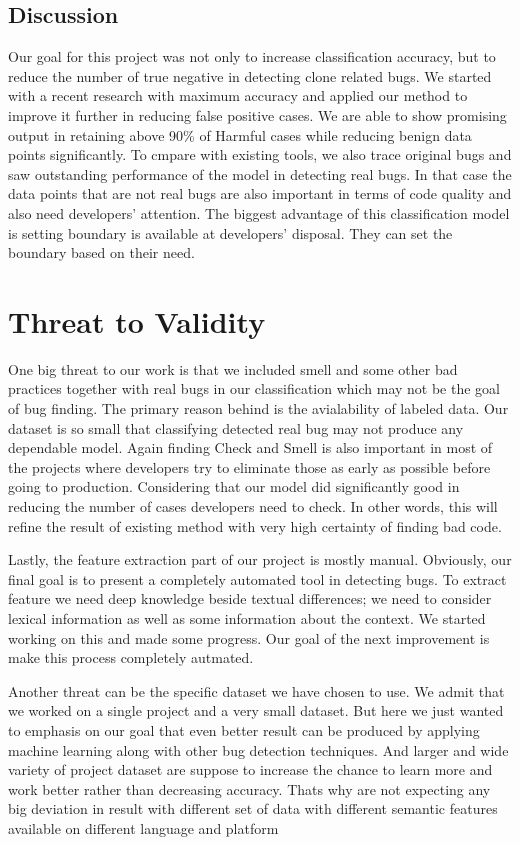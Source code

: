 \documentclass[nocopyrightspace]{sigplanconf}
\begin{document}
\subsection{Discussion}
Our goal for this project was not only to increase classification accuracy, but to reduce the number of true negative in detecting clone related bugs. We started with a recent research with maximum accuracy and applied our method to improve it further in reducing false positive cases. We are able to show promising output in retaining above 90\% of Harmful cases while reducing benign data points significantly. To cmpare with existing tools, we also trace original bugs and saw outstanding performance of the model in detecting real bugs. In that case the data points that are not real bugs are also important in terms of code quality and also need developers' attention. The biggest advantage of this classification model is setting boundary is available at developers' disposal. They can set the boundary based on their need.

\section{Threat to Validity}
One big threat to our work is that we included smell and some other bad practices together with real bugs in our classification which may not be the goal of bug finding. The primary reason behind is the avialability of labeled data. Our dataset is so small that classifying detected real bug may not produce any dependable model. Again finding Check and Smell is also important in most of the projects where developers try to eliminate those as early as possible before going to production. Considering that our model did significantly good in reducing the number of cases developers need to check. In other words, this will refine the result of existing method with very high certainty of finding bad code.

\vspace{10pt}
\noindent
Lastly, the feature extraction part of our project is mostly manual. Obviously, our final goal is to present a completely automated tool in detecting bugs. To extract feature we need deep knowledge beside textual differences; we need to consider lexical information as well as some information about the context. We started working on this and made some progress. Our goal of the next improvement is make this process completely autmated.

\vspace{10pt}
\noindent
Another threat can be the specific dataset we have chosen to use. We admit that we worked on a single project and a very small dataset. But here we just wanted to emphasis on our goal that even better result can be produced by applying machine learning along with other bug detection techniques. And larger and wide variety of project dataset are suppose to increase the chance to learn more and work better rather than decreasing accuracy. Thats why are not expecting any big deviation in result with different set of data with different semantic features available on different language and platform
\end{document}
